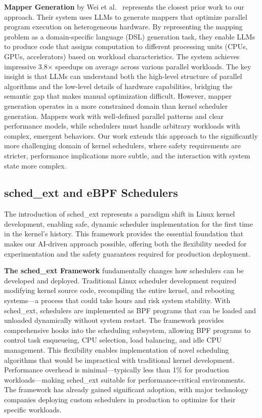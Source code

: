 \textbf{Mapper Generation} by Wei et al.~\cite{wei2024mapper} represents the closest prior work to our approach. Their system uses LLMs to generate mappers that optimize parallel program execution on heterogeneous hardware. By representing the mapping problem as a domain-specific language (DSL) generation task, they enable LLMs to produce code that assigns computation to different processing units (CPUs, GPUs, accelerators) based on workload characteristics. The system achieves impressive 3.8× speedups on average across various parallel workloads. The key insight is that LLMs can understand both the high-level structure of parallel algorithms and the low-level details of hardware capabilities, bridging the semantic gap that makes manual optimization difficult. However, mapper generation operates in a more constrained domain than kernel scheduler generation. Mappers work with well-defined parallel patterns and clear performance models, while schedulers must handle arbitrary workloads with complex, emergent behaviors. Our work extends this approach to the significantly more challenging domain of kernel schedulers, where safety requirements are stricter, performance implications more subtle, and the interaction with system state more complex.

\subsection{sched\_ext and eBPF Schedulers}

The introduction of sched\_ext represents a paradigm shift in Linux kernel development, enabling safe, dynamic scheduler implementation for the first time in the kernel's history. This framework provides the essential foundation that makes our AI-driven approach possible, offering both the flexibility needed for experimentation and the safety guarantees required for production deployment.

\textbf{The sched\_ext Framework} fundamentally changes how schedulers can be developed and deployed. Traditional Linux scheduler development required modifying kernel source code, recompiling the entire kernel, and rebooting systems—a process that could take hours and risk system stability. With sched\_ext, schedulers are implemented as BPF programs that can be loaded and unloaded dynamically without system restart. The framework provides comprehensive hooks into the scheduling subsystem, allowing BPF programs to control task enqueueing, CPU selection, load balancing, and idle CPU management. This flexibility enables implementation of novel scheduling algorithms that would be impractical with traditional kernel development. Performance overhead is minimal—typically less than 1\% for production workloads—making sched\_ext suitable for performance-critical environments. The framework has already gained significant adoption, with major technology companies deploying custom schedulers in production to optimize for their specific workloads.

